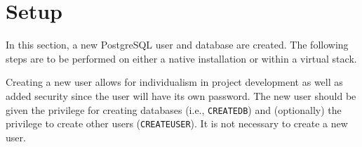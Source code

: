 %
%
%
%
%
\section{Setup}
\label{sec:dbsetup}
In this section, a new PostgreSQL user and database are created.  
The following steps are to be performed on either a native installation or within a virtual stack. 

Creating a new user allows for individualism in project development as well as added security since the user will have its own password. 
The new user should be given the privilege for creating databases (i.e., \texttt{CREATEDB}) and (optionally) the privilege to create other users (\texttt{CREATEUSER}). 
It is not necessary to create a new user. 

